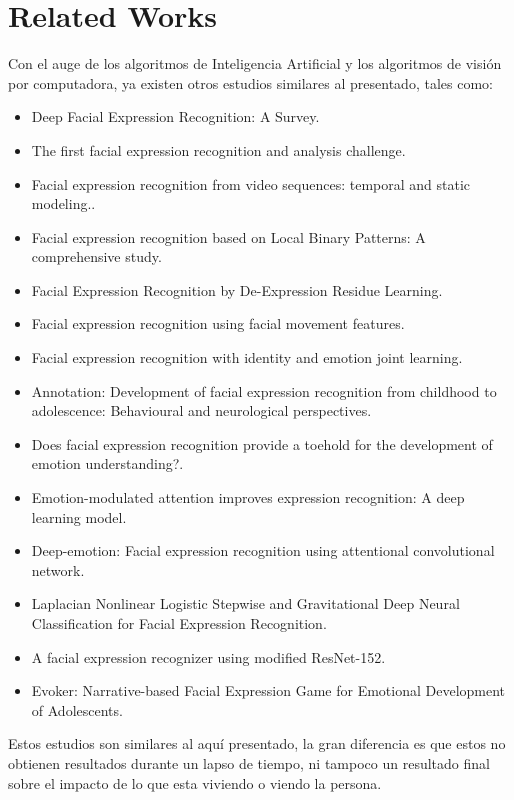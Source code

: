 
\section{Related Works}

Con el auge de los algoritmos de Inteligencia Artificial y los algoritmos de
visión por computadora, ya existen otros estudios similares al presentado,
tales como:
\begin{itemize}
    \item Deep Facial Expression Recognition: A Survey\cite[]{li2020deep}.
    \item The first facial expression recognition and analysis
          challenge\cite[]{valstar2011first}.
    \item Facial expression recognition from video sequences: temporal and static
          modeling.\cite[]{cohen2003facial}.
    \item Facial expression recognition based on Local Binary Patterns: A comprehensive
          study\cite[]{shan2009facial}.
    \item Facial Expression Recognition by De-Expression Residue
          Learning\cite[]{yang2018facial}.
    \item Facial expression recognition using facial movement
          features\cite[]{zhang2011facial}.
    \item Facial expression recognition with identity and emotion joint
          learning\cite[]{li2018facial}.
    \item Annotation: Development of facial expression recognition from childhood to
          adolescence: Behavioural and neurological
          perspectives\cite[]{herba2004annotation}.
    \item Does facial expression recognition provide a toehold for the development of
          emotion understanding?\cite[]{strand2016does}.
    \item Emotion-modulated attention improves expression recognition: A deep learning
          model\cite[]{barros2017emotion}.
    \item Deep-emotion: Facial expression recognition using attentional convolutional
          network\cite[]{minaee2021deep}.
    \item Laplacian Nonlinear Logistic Stepwise and Gravitational Deep Neural
          Classification for Facial Expression
          Recognition\cite[]{kumari4096801laplacian}.
    \item A facial expression recognizer using modified ResNet-152\cite[]{xu2022facial}.
    \item Evoker: Narrative-based Facial Expression Game for Emotional Development of
          Adolescents\cite[]{hong2022evoker}.

\end{itemize}
Estos estudios son similares al aquí presentado, la gran diferencia es que estos no
obtienen resultados durante un lapso de tiempo, ni tampoco un resultado final sobre
el impacto de lo que esta viviendo o viendo la persona.
